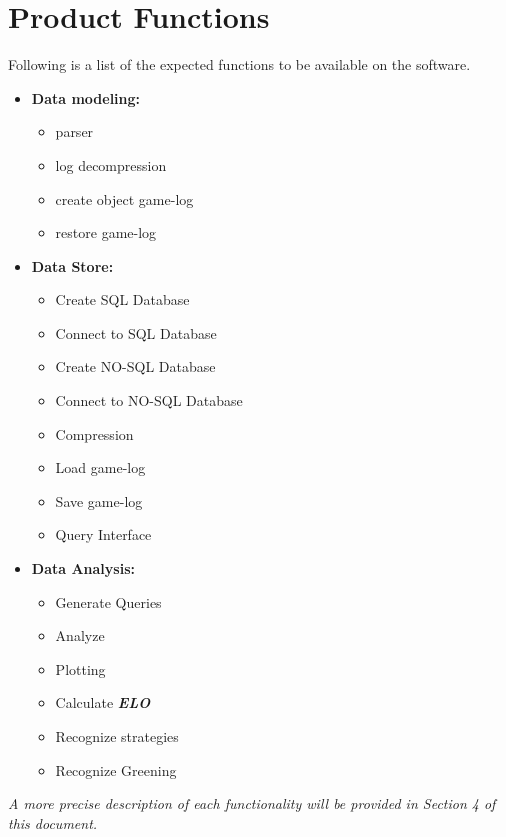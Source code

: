 \documentclass{scrreprt}
\begin{document}
\section{Product Functions}
Following is a list of the expected functions to be available on the software.
\begin{itemize}
  \item{\textbf{Data modeling:}}
    \begin{itemize}
      \item{parser}
      \item{log decompression}
      \item{create object game-log}
      \item{restore game-log}
    \end{itemize}
  \item{\textbf{Data Store:}}
    \begin{itemize}
      \item{Create SQL Database}
      \item{Connect to SQL Database}
      \item{Create NO-SQL Database}
      \item{Connect to NO-SQL Database}
      \item{Compression}
      \item{Load game-log}
      \item{Save game-log}
      \item{Query Interface}
    \end{itemize}
  \item{\textbf{Data Analysis:}}
    \begin{itemize}
      \item{Generate Queries}
      \item{Analyze}
      \item{Plotting}
      \item{Calculate \textit{\textbf{ELO}}}
      \item{Recognize strategies}
      \item{Recognize Greening}
    \end{itemize}
\end{itemize}
\textit{ A more precise description of each functionality will be provided in Section 4 of this document. }
\end{document}
